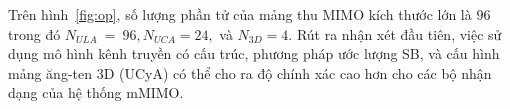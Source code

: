 Trên hình~\ref{fig:op}, số lượng phần tử của mảng thu MIMO kích thước lớn là $96$ trong đó $N_{ULA}~=~96, N_{UCA} = 24,$ và $N_{3D} = 4$. Rút ra nhận xét đầu tiên, việc sử dụng mô hình kênh truyền có cấu trúc, phương pháp ước lượng SB, và cấu hình mảng ăng-ten 3D (UCyA) có thể cho ra độ chính xác cao hơn cho các bộ nhận dạng của hệ thống mMIMO.
